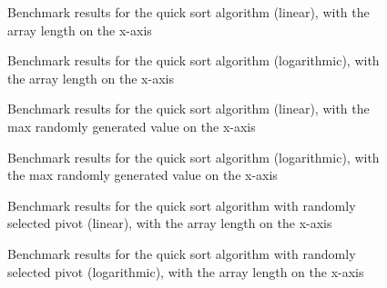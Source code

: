 

\begin{multicols}{2}

\begin{figure}[H]
  \centering
  
  \caption{Benchmark results for the quick sort algorithm (linear), with the array length on the x-axis}
\end{figure}

\begin{figure}[H]
  \centering
  
  \caption{Benchmark results for the quick sort algorithm (logarithmic), with the array length on the x-axis}
\end{figure}

\end{multicols}

\begin{multicols}{2}

\begin{figure}[H]
  \centering
  
  \caption{Benchmark results for the quick sort algorithm (linear), with the max randomly generated value on the x-axis}
\end{figure}

\begin{figure}[H]
  \centering
  
  \caption{Benchmark results for the quick sort algorithm (logarithmic), with the max randomly generated value on the x-axis}
\end{figure}

\end{multicols}


\newpage



\begin{multicols}{2}

\begin{figure}[H]
  \centering
  
  \caption{Benchmark results for the quick sort algorithm with randomly selected pivot (linear), with the array length on the x-axis}
\end{figure}

\begin{figure}[H]
  \centering
  
  \caption{Benchmark results for the quick sort algorithm with randomly selected pivot (logarithmic), with the array length on the x-axis}
\end{figure}

\end{multicols}

